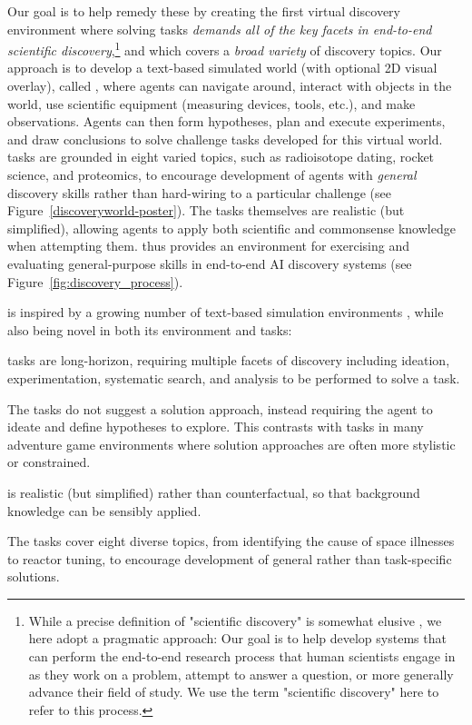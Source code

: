 Our goal is to help remedy these by creating the first virtual discovery environment
where solving tasks {\it demands all of the key facets in end-to-end
scientific discovery},\footnote{
   While a precise definition of "scientific discovery" is somewhat elusive
   \citep[][]{langley1987scientific,popper2005logic}, we here adopt a pragmatic
   approach: Our goal is to help develop systems that can perform the end-to-end
   research process that human scientists engage in as they work on a problem,
   attempt to answer a question, or more generally advance their field of study.
   We use the term "scientific discovery" here to refer to this process.}
and which covers a {\it broad variety} of discovery topics.
Our approach is to develop a text-based simulated world (with optional 2D visual overlay), called \env,
where agents can navigate around, interact with objects in the world,
use scientific equipment (measuring devices, tools, etc.), and make observations.
Agents can then form hypotheses, plan and execute experiments, and draw conclusions
to solve challenge tasks developed for this virtual world.
\env tasks are grounded in eight varied topics,
such as radioisotope dating, rocket science, and proteomics, to encourage
development of agents with {\it general} discovery skills rather than hard-wiring
to a particular challenge (see Figure~\ref{discoveryworld-poster}).
The tasks themselves are realistic (but simplified),
allowing agents to apply both scientific and commonsense
knowledge when attempting them.
\env thus provides an environment for exercising and evaluating
general-purpose skills in end-to-end AI discovery systems (see Figure~\ref{fig:discovery_process}).


\env is inspired by a growing number of text-based simulation environments
\citep[inter alia]{Ct2018TextWorldAL,Wang2022ScienceWorldIY}, while also being novel in both its environment and tasks:
\begin{ite}
\item \env tasks are long-horizon, requiring multiple facets of
 discovery including ideation, experimentation, systematic search,
 and analysis to be performed to solve a task.
\item The tasks do not suggest a solution approach, instead requiring the agent
  to ideate and define hypotheses to explore. This contrasts with
  tasks in many adventure game environments where solution approaches
  are often more stylistic or constrained.
\item \env is realistic (but simplified) rather than counterfactual,
  so that background knowledge can be sensibly applied.
\item The tasks cover eight diverse topics, from identifying the cause of space illnesses to reactor tuning,
  to encourage development of general rather than task-specific solutions.
\end{ite}

